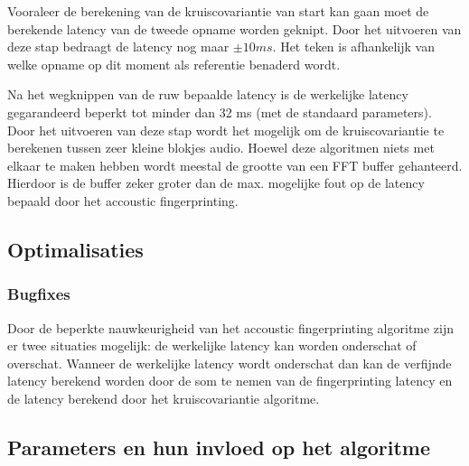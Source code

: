 Vooraleer de berekening van de kruiscovariantie van start kan gaan moet de berekende latency van de tweede opname worden geknipt. Door het uitvoeren van deze stap bedraagt de latency nog maar $ \pm 10 ms $. Het teken is afhankelijk van welke opname op dit moment als referentie benaderd wordt.

Na het wegknippen van de ruw bepaalde latency is de werkelijke latency gegarandeerd beperkt tot minder dan 32 ms (met de standaard parameters). Door het uitvoeren van deze stap wordt het mogelijk om de kruiscovariantie te berekenen tussen zeer kleine blokjes audio. Hoewel deze algoritmen niets met elkaar te maken hebben wordt meestal de grootte van een FFT buffer gehanteerd. Hierdoor is de buffer zeker groter dan de max. mogelijke fout op de latency bepaald door het accoustic fingerprinting.


\subsection{Optimalisaties}

\subsubsection{Bugfixes}

Door de beperkte nauwkeurigheid van het accoustic fingerprinting algoritme zijn er twee situaties mogelijk: de werkelijke latency kan worden onderschat of overschat. Wanneer de werkelijke latency wordt onderschat dan kan de verfijnde latency berekend worden door de som te nemen van de fingerprinting latency en de latency berekend door het kruiscovariantie algoritme. 





\subsection{Parameters en hun invloed op het algoritme}

